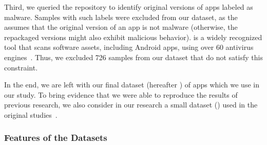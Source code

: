 Third, we queried the \vt repository
to identify original versions of apps labeled as malware. Samples with such labels were excluded from our dataset,
as the \mas assumes that the original version of an app is not malware (otherwise, the repackaged versions might
also exhibit malicious behavior). \vt is a widely recognized tool that scans software assets, including Android apps,
using over 60 antivirus engines~\cite{DBLP:journals/ese/KhanmohammadiEH19}. Thus, we excluded 726 samples from our dataset that
do not satisfy this constraint.

In the end, we are left with our final dataset (hereafter \cds) of \apps apps which we use in our study. 
To bring evidence that we were able to reproduce the results of previous research, we also consider in our research
a small dataset (\sds) used in the original studies~\cite{DBLP:conf/wcre/BaoLL18,DBLP:journals/jss/CostaMMSSBNR22}.







\subsubsection{Features of the Datasets}
 
